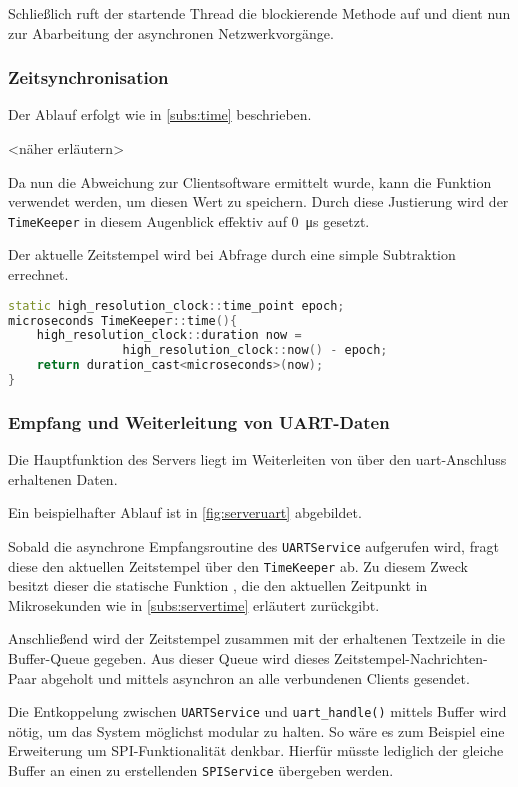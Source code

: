 Schließlich ruft der startende Thread die blockierende Methode
 auf und dient nun zur Abarbeitung der
asynchronen Netzwerkvorgänge.
\subsubsection*{Zeitsynchronisation}
Der Ablauf erfolgt wie in \autoref{subs:time} beschrieben.

<näher erläutern>

Da nun die Abweichung zur Clientsoftware ermittelt wurde, kann die Funktion
\newline{} verwendet werden,
um diesen Wert zu speichern. Durch diese Justierung wird der \texttt{TimeKeeper}
in diesem Augenblick effektiv auf \SI{0}{\micro\second} gesetzt.

Der aktuelle Zeitstempel wird bei Abfrage durch eine simple Subtraktion
errechnet.
\begin{lstlisting}[language=C++]
static high_resolution_clock::time_point epoch;
microseconds TimeKeeper::time(){
    high_resolution_clock::duration now = 
    			high_resolution_clock::now() - epoch;
    return duration_cast<microseconds>(now);
}
\end{lstlisting}

\subsubsection*{Empfang und Weiterleitung von UART-Daten}
Die Hauptfunktion des Servers liegt im Weiterleiten von über den
\gls{uart}-Anschluss erhaltenen Daten.

Ein beispielhafter Ablauf ist in \autoref{fig:serveruart} abgebildet.

Sobald die asynchrone Empfangsroutine des \texttt{UARTService} aufgerufen wird,
fragt diese den aktuellen Zeitstempel über den \texttt{TimeKeeper} ab. Zu
diesem Zweck besitzt dieser die statische Funktion , die den
aktuellen Zeitpunkt in Mikrosekunden wie in \autoref{subs:servertime}
erläutert zurückgibt.

Anschließend wird der Zeitstempel zusammen mit der erhaltenen Textzeile in die
Buffer-Queue gegeben. Aus dieser Queue wird dieses Zeitstempel-Nachrichten-Paar
abgeholt und mittels  asynchron an alle verbundenen Clients gesendet.

Die Entkoppelung zwischen \texttt{UARTService} und \texttt{uart\_handle()}
mittels Buffer wird nötig, um das System möglichst modular zu halten. So wäre es
zum Beispiel eine Erweiterung um SPI-Funktionalität denkbar. Hierfür müsste
lediglich der gleiche Buffer an einen zu erstellenden \texttt{SPIService}
übergeben werden.

